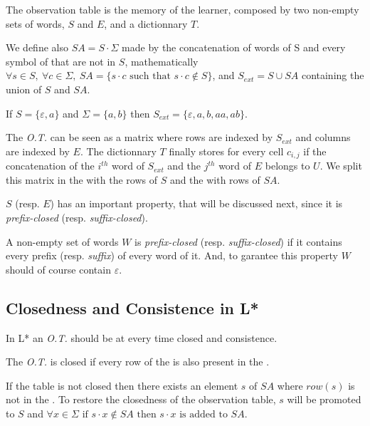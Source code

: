 \begin{definition}
  The observation table is the memory of the learner, composed by two non-empty sets of words, $S$ and $E$, and a dictionnary $T$.
\end{definition}

We define also $SA = S \cdot \Sigma$ made by the concatenation of words of S and every symbol of \alphabet{} that are not in $S$, mathematically $\forall s \in S, \: \forall c \in \Sigma, \: SA = \{s \cdot c \text{ such that } s \cdot c \notin S \} $, and $S_{ext} = S \cup SA$ containing the union of $S$ and $SA$.
\begin{example}
  If $S = \{\varepsilon, a\}$ and $\Sigma = \{a, b\}$ then $S_{ext} = \{\varepsilon, a, b, aa, ab\}$.
\end{example}

The \textit{O.T.} can be seen as a matrix where rows are indexed by $S_{ext}$ and columns are indexed by $E$. The dictionnary $T$ finally stores for every cell $c_{i,j}$ if the concatenation of the $i^{th}$ word of $S_{ext}$ and the $j^{th}$ word of $E$ belongs to $U$. We split this matrix in the \upperPart{} with the rows of $S$ and the \lowerPart{} with rows of $SA$.


$S$ (resp. $E$) has an important property, that will be discussed next, since it is \textit{prefix-closed} (resp. \textit{suffix-closed}).

\begin{definition}
  A non-empty set of words $W$ is \textit{prefix-closed} (resp. \textit{suffix-closed}) if it contains every prefix (resp. \textit{suffix}) of every word of it. And, to garantee this property $W$ should of course contain $\varepsilon$.
\end{definition}

\subsection{Closedness and Consistence in L*}

In L* an \textit{O.T.} should be at every time closed and consistence.

\begin{definition}[Closedness]
  The \textit{O.T.} is closed if every row of the \lowerPart{} is also present in the \upperPart{}.
\end{definition}

If the table is not closed then there exists an element $s$ of $SA$ where $row(s)$ is not in the \upperPart{}. To restore the closedness of the observation table, $s$ will be promoted to $S$ and $\forall x \in \Sigma \text{ if } s \cdot x \notin SA \text{ then } s \cdot x \text{ is added to } SA$.

